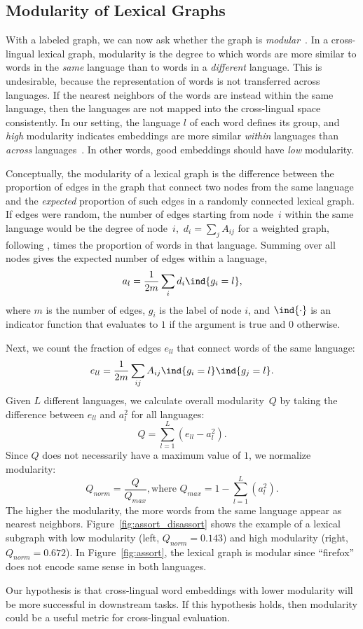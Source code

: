 \subsection{Modularity of Lexical Graphs}


With a labeled graph, we can now ask whether the graph is
\emph{modular}~\cite{newman2010networks}.
 In a cross-lingual
lexical graph, modularity is the degree to which words are more
similar to words in the \emph{same} language than to words in a
\emph{different} language.  This is undesirable, because the
representation of words is not transferred across languages. 
If the nearest neighbors of the words are instead within the same language,
then the languages are not mapped into the cross-lingual space
consistently.  In our setting, the language $l$ of each word defines
its group, and \emph{high} modularity indicates embeddings are more
similar \emph{within} languages than \emph{across}
languages~\citep{newman2003mixing,newman2004finding}. 
In other words, good embeddings should have \emph{low} modularity.


Conceptually, the modularity of a lexical graph is the difference
between the proportion of edges in the graph that connect two nodes
from the same language and the {\em expected} proportion of such
edges in a randomly connected lexical graph.
If edges were random, the number of edges starting from node~$i$ within the same language would be the degree of node~$i$,~$d_i
= \sum_j A_{ij}$ for a weighted graph, following \citet{PhysRevE.70.056131}, times the proportion of words in that language.  Summing over all nodes gives the expected number of edges within a language,
\begin{equation}
a_{l} = \frac{1}{2m} \sum_{i} d_{i} \ind{g_i=l},
\end{equation}
where $m$ is the number of edges, $g_i$ is the label of node $i$, and $\ind{\cdot}$ is an indicator function
that evaluates to $1$ if the argument is true and $0$ otherwise. 

Next, we count the fraction of edges $e_{ll}$ that 
connect words of the same language:\begin{equation}
e_{ll} = \frac{1}{2m} \sum_{ij} A_{ij} \ind{g_i=l} \ind{g_j=l}.
\end{equation}
Given $L$ different languages, we calculate overall modularity~$Q$ by
taking the difference between $e_{ll}$ and $a_l^2$ for all languages:\begin{equation}
\label{unnorm_modularity}
Q = \sum_{l = 1}^L (e_{ll} - a_l^2).
\end{equation}
Since $Q$ does not necessarily have a maximum value of $1$, 
we normalize modularity:\begin{equation}
Q_{norm} = \frac{Q}{Q_{max}}, \textrm{where} \,\, Q_{max} = 1 - \sum_{l = 1}^L (a_l^2). 
\end{equation}The higher the modularity, the more words from the same language
appear as nearest neighbors.  Figure~\ref{fig:assort_disassort} shows
the example of a lexical subgraph with low modularity (left, $Q_{norm} =
0.143$) and high modularity (right, $Q_{norm}=0.672$).  In
Figure~\ref{fig:assort}, the lexical graph is modular since
``firefox'' does not encode same sense in both languages.

Our hypothesis is that cross-lingual word embeddings with lower modularity
will be more successful in downstream tasks.
If this hypothesis holds, then modularity could be a useful
metric for cross-lingual evaluation.
